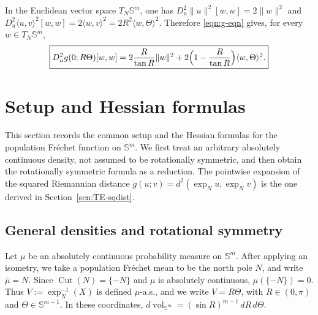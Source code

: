 \documentclass{amsart}
\theoremstyle{definition}
\theoremstyle{remark}
\newcommand{\mubar}{\bar{\mu}}
\newcommand\0{\boldsymbol{0}}
\begin{document}
In the Euclidean vector space \(T_N\mathbb S^m\), one has \(D^2_u\|u\|^2[w,w]=2\|w\|^2\) and \(D^2_u\langle u,v\rangle^2[w,w]=2\langle w,v\rangle^2=2R^2\langle w,\Theta\rangle^2\).  Therefore \eqref{eqn:g-eqn} gives, for every \(w\in T_N\mathbb S^m\),
\begin{equation}\label{eqn:Hess-g}
\boxed{
D_u^2 g(0;R\Theta)[w,w]
=
2\frac{R}{\tan R}\|w\|^2
+
2\Bigl(1-\frac{R}{\tan R}\Bigr)\langle w,\Theta\rangle^2.
}
\end{equation}



\section{Setup and Hessian formulas}
\label{scn:common-setup-derivatives}
\label{scn:support-rot-symm}
\label{scn:support-general-density}

This section records the common setup and the Hessian formulas for the population Fr\'echet function on \(\mathbb S^m\).  We first treat an arbitrary absolutely continuous density, not assumed to be rotationally symmetric, and then obtain the rotationally symmetric formula as a reduction.  The pointwise expansion of the squared Riemannian distance \(g(u;v)=d^2(\exp_Nu,\exp_Nv)\) is the one derived in Section~\ref{scn:TE-sqdist}.

\subsection{General densities and rotational symmetry}
\label{scn:set-up}
\label{scn:set-up-general-density}

Let \(\mu\) be an absolutely continuous probability measure on \(\mathbb S^m\).  After applying an isometry, we take a population Fr\'echet mean to be the north pole \(N\), and write \(\mubar=N\).  Since \(\operatorname{Cut}(N)=\{-N\}\) and \(\mu\) is absolutely continuous, \(\mu(\{-N\})=0\).  Thus \(V:=\exp_N^{-1}(X)\) is defined \(\mu\)-a.s., and we write \(V=R\Theta\), with \(R\in(0,\pi)\) and \(\Theta\in\mathbb S^{m-1}\).  In these coordinates, \(d\operatorname{vol}_{\mathbb S^m}=(\sin R)^{m-1}\,dR\,d\Theta\).
\end{document}
